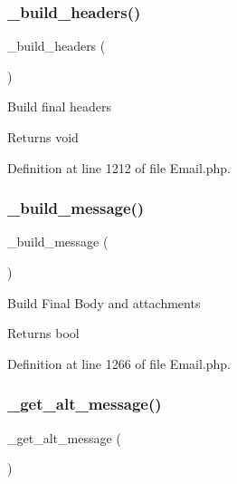 \mbox{\label{class_c_i___email_a5dbec091c7efce89395a40e460b75d49}} 
\subsubsection{\texorpdfstring{\_build\_headers()}{\_build\_headers()}}
{\footnotesize\ttfamily \+\_\+build\+\_\+headers (\begin{DoxyParamCaption}{ }\end{DoxyParamCaption})\hspace{0.3cm}{\ttfamily [protected]}}

Build final headers

\begin{DoxyReturn}{Returns}
void 
\end{DoxyReturn}


Definition at line 1212 of file Email.\+php.

\mbox{\label{class_c_i___email_a9ddc60e529eb909ff0879781a6f296ff}} 
\subsubsection{\texorpdfstring{\_build\_message()}{\_build\_message()}}
{\footnotesize\ttfamily \+\_\+build\+\_\+message (\begin{DoxyParamCaption}{ }\end{DoxyParamCaption})\hspace{0.3cm}{\ttfamily [protected]}}

Build Final Body and attachments

\begin{DoxyReturn}{Returns}
bool 
\end{DoxyReturn}


Definition at line 1266 of file Email.\+php.

\mbox{\label{class_c_i___email_a1a87461e94ab7466b7b6f22682c4a055}} 
\subsubsection{\texorpdfstring{\_get\_alt\_message()}{\_get\_alt\_message()}}
{\footnotesize\ttfamily \+\_\+get\+\_\+alt\+\_\+message (\begin{DoxyParamCaption}{ }\end{DoxyParamCaption})\hspace{0.3cm}{\ttfamily [protected]}}

